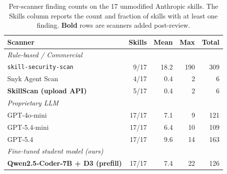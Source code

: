 
\begin{table}[t]
\centering
\caption{Per-scanner finding counts on the 17 unmodified Anthropic skills. The Skills column reports the count and fraction of skills with at least one finding. \textbf{Bold} rows are scanners added post-review.}
\label{tab:baseline_aggregate}
\footnotesize
\setlength{\tabcolsep}{4pt}
\begin{tabular}{lrrrr}
\toprule
Scanner & Skills & Mean & Max & Total \\
\midrule
\multicolumn{5}{l}{\textit{Rule-based / Commercial}} \\
\texttt{skill-security-scan}            & 9/17  & 18.2 & 190 & 309 \\
Snyk Agent Scan                         & 4/17  &  0.4 &   2 &   6 \\
\textbf{SkillScan (upload API)}         & 5/17  &  0.4 &   2 &   6 \\
\midrule
\multicolumn{5}{l}{\textit{Proprietary LLM}} \\
GPT-4o-mini                             & 17/17 &  7.1 &   9 & 121 \\
GPT-5.4-mini                            & 17/17 &  6.4 &  10 & 109 \\
GPT-5.4                                 & 17/17 &  9.6 &  14 & 163 \\
\midrule
\multicolumn{5}{l}{\textit{Fine-tuned student model (ours)}} \\
\textbf{Qwen2.5-Coder-7B + D3 (prefill)} & 17/17 &  7.4 &  22 & 126 \\
\bottomrule
\end{tabular}
\end{table}